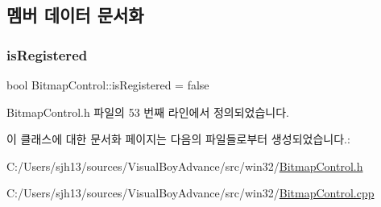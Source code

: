 \subsection{멤버 데이터 문서화}
\mbox{\label{class_bitmap_control_acd16ac02d48f1201fc90470b6e29c7fe}} 
\subsubsection{\texorpdfstring{is\+Registered}{isRegistered}}
{\footnotesize\ttfamily bool Bitmap\+Control\+::is\+Registered = false\hspace{0.3cm}{\ttfamily [static]}}



Bitmap\+Control.\+h 파일의 53 번째 라인에서 정의되었습니다.



이 클래스에 대한 문서화 페이지는 다음의 파일들로부터 생성되었습니다.\+:\begin{DoxyCompactItemize}
\item 
C\+:/\+Users/sjh13/sources/\+Visual\+Boy\+Advance/src/win32/\mbox{\hyperlink{_bitmap_control_8h}{Bitmap\+Control.\+h}}\item 
C\+:/\+Users/sjh13/sources/\+Visual\+Boy\+Advance/src/win32/\mbox{\hyperlink{_bitmap_control_8cpp}{Bitmap\+Control.\+cpp}}\end{DoxyCompactItemize}
